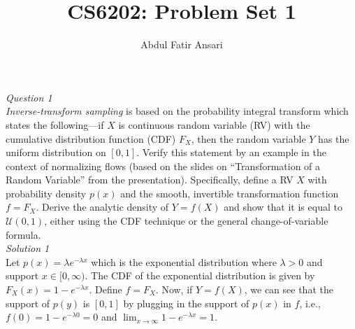 \documentclass{article}
\title{CS6202: Problem Set 1}
\author{Abdul Fatir Ansari}
\date{}
\begin{document}
\maketitle

\noindent\emph{Question 1}
\\[3pt]
\textit{Inverse-transform sampling} is based on the probability integral transform which states the following---if $X$ is continuous random variable (RV) with the cumulative distribution function (CDF) $F_X$, then the random variable $Y$ has the uniform distribution on $[0,1]$. Verify this statement by an example in the context of normalizing flows (based on the slides on ``Transformation of a Random Variable'' from the presentation). Specifically, define a RV $X$ with probability density $p(x)$ and the smooth, invertible transformation function $f = F_X$. Derive the analytic density of $Y = f(X)$ and show that it is equal to $\mathcal{U}(0,1)$, either using the CDF technique or the general change-of-variable formula.  
\\[10pt]
\emph{Solution 1}
\\[3pt]
Let $p(x) = \lambda e^{-\lambda x}$ which is the exponential distribution where $\lambda > 0$ and support $x\in[0,\infty)$. The CDF of the exponential distribution is given by $F_X(x) = 1 - e^{-\lambda x}$. Define $f = F_X$. Now, if $Y = f(X)$, we can see that the support of $p(y)$ is $[0,1]$ by plugging in the support of $p(x)$ in $f$, i.e., $f(0) = 1 - e^{-\lambda 0} = 0$ and $\lim_{x\to\infty}1 - e^{-\lambda x} = 1$.
\end{document}
